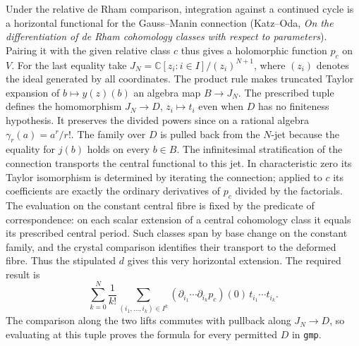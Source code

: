 Under the relative de Rham comparison, integration against a continued
cycle is a horizontal functional for the Gauss--Manin connection
(Katz--Oda, \emph{On the differentiation of de Rham cohomology
classes with respect to parameters}). Pairing it with the given
relative class $c$ thus gives a holomorphic function $p_c$ on $V$.
For the last equality take
$J_N=\mathbb C[z_i:i\in I]/(z_i)^{N+1}$, where $(z_i)$ denotes the
ideal generated by all coordinates. The product rule makes truncated
Taylor expansion of $b\mapsto y(z)(b)$ an algebra map $B\to J_N$.
The prescribed tuple defines the
homomorphism $J_N\to D$, $z_i\mapsto t_i$ even when $D$ has no
finiteness hypothesis. It preserves the divided powers since on a
rational algebra $\gamma_r(a)=a^r/r!$. The family over $D$ is pulled back from the
$N$-jet because the equality for $j(b)$ holds on every $b\in B$.
The infinitesimal stratification of the connection transports the
central functional to this jet. In characteristic zero its Taylor
isomorphism is determined by iterating the connection; applied to
$c$ its coefficients are exactly the ordinary derivatives of $p_c$
divided by the factorials. The evaluation on the constant central
fibre is fixed by the predicate of correspondence: on each scalar
extension of a central cohomology class it equals its prescribed
central period. Such classes span by base change on the constant
family, and the crystal comparison identifies their transport to
the deformed fibre. Thus the stipulated $d$ gives this very
horizontal extension. The required result is
\[
 \sum_{k=0}^N\frac1{k!}\!
  \sum_{(i_1,\ldots,i_k)\in I^k}
  (\partial_{i_1}\cdots\partial_{i_k}p_c)(0)\,t_{i_1}\cdots t_{i_k}.
\]
The comparison along the two lifts commutes with pullback along
$J_N\to D$, so evaluating at this tuple proves the formula for
every permitted $D$ in \texttt{gmp}.

